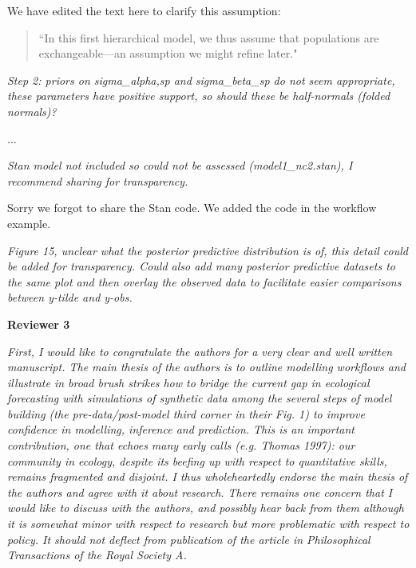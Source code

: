 \documentclass[11pt,letter]{article}
\begin{document}
We have edited the text here to clarify this assumption:
\begin{quote}
``In this first hierarchical model, we thus assume that populations are exchangeable---an assumption we might refine later."
\end{quote}


\begin{mybox}
\emph{Step 2: priors on sigma\_alpha,sp and sigma\_beta\_sp do not seem
appropriate, these parameters have positive support, so should these be
half-normals (folded normals)?}
\end{mybox}

...

\begin{mybox}
\emph{Stan model not included so could not be assessed (model1\_nc2.stan), I
recommend sharing for transparency.}
\end{mybox}

Sorry we forgot to share the Stan code. We added the code in the workflow example.

\begin{mybox}
\emph{Figure 15, unclear what the posterior predictive distribution is of,
this detail could be added for transparency. Could also add many
posterior predictive datasets to the same plot and then overlay the
observed data to facilitate easier comparisons between y-tilde and y-obs.}
\end{mybox}


{\bf Reviewer 3}

\begin{mybox}
\emph{First, I would like to congratulate the authors for a very clear and well written manuscript. The main thesis of the authors is to outline modelling workflows and illustrate in broad brush strikes how to bridge the current gap in ecological forecasting with simulations of synthetic data among the several steps of model building (the pre-data/post-model third corner in their Fig. 1) to improve confidence in modelling, inference and prediction. This is an important contribution, one that echoes many early calls (e.g. Thomas 1997): our community in ecology, despite its beefing up with respect to quantitative skills, remains fragmented and disjoint. I thus wholeheartedly endorse the main thesis of the authors and agree with it about research. There remains one concern that I would like to discuss with the authors, and possibly hear back from them although it is somewhat minor with respect to research but more problematic with respect to policy. It should not deflect from publication of the article in Philosophical Transactions of the Royal Society A.}
\end{mybox}
\end{document}
